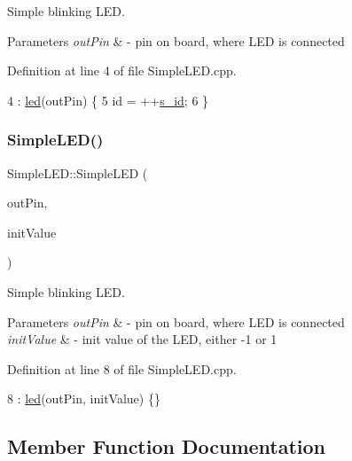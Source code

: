 Simple blinking L\+ED. 


\begin{DoxyParams}{Parameters}
{\em out\+Pin} & -\/ pin on board, where L\+ED is connected \\
\hline
\end{DoxyParams}


Definition at line 4 of file Simple\+L\+E\+D.\+cpp.


\begin{DoxyCode}
4                                   : \hyperlink{class_simple_l_e_d_ae16514a63d8a19ab12e9adb19bba086d}{led}(outPin) \{
5     \textcolor{keywordtype}{id} = ++\hyperlink{class_abstract_component_a99ce3e5fe7d73dac569b874c15fcaf0d}{s\_id};
6 \}
\end{DoxyCode}
\mbox{\label{class_simple_l_e_d_a035610e281499c6a1160b2ae6b2797f0}} 
\subsubsection{\texorpdfstring{Simple\+L\+E\+D()}{SimpleLED()}\hspace{0.1cm}{\footnotesize\ttfamily [2/2]}}
{\footnotesize\ttfamily Simple\+L\+E\+D\+::\+Simple\+L\+ED (\begin{DoxyParamCaption}\item[{Pin\+Name}]{out\+Pin,  }\item[{int}]{init\+Value }\end{DoxyParamCaption})}



Simple blinking L\+ED. 


\begin{DoxyParams}{Parameters}
{\em out\+Pin} & -\/ pin on board, where L\+ED is connected \\
\hline
{\em init\+Value} & -\/ init value of the L\+ED, either -\/1 or 1 \\
\hline
\end{DoxyParams}


Definition at line 8 of file Simple\+L\+E\+D.\+cpp.


\begin{DoxyCode}
8 : \hyperlink{class_simple_l_e_d_ae16514a63d8a19ab12e9adb19bba086d}{led}(outPin, initValue) \{\}
\end{DoxyCode}


\subsection{Member Function Documentation}
\mbox{\label{class_abstract_component_ac0b440d1d642ff1292ec3c544d75a8f1}} 
